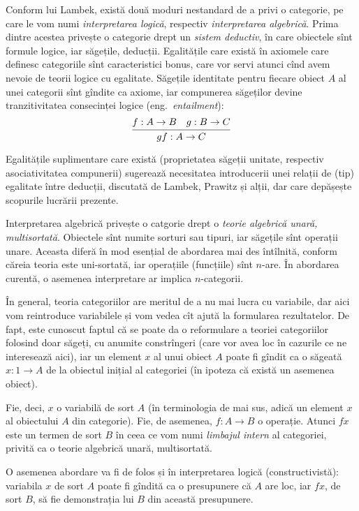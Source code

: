 \documentclass[a4paper]{article}
\begin{document}
Conform lui Lambek, există două moduri nestandard de a privi o categorie,
pe care le vom numi \emph{interpretarea logică}, respectiv \emph{interpretarea %
algebrică}. Prima dintre acestea privește o categorie drept un \emph{sistem %
deductiv}, în care obiectele sînt formule logice, iar săgețile, deducții.
Egalitățile care există în axiomele care definesc categoriile sînt caracteristici
bonus, care vor servi atunci cînd avem nevoie de teorii logice cu egalitate.
Săgețile identitate pentru fiecare obiect $ A $ al unei categorii sînt gîndite
ca axiome, iar compunerea săgeților devine tranzitivitatea consecinței logice
(eng.\ \emph{entailment}):
\[
  \begin{prooftree}
    \hypo{f : A \to B \quad g : B \to C}
    \infer1{gf : A \to C}
  \end{prooftree}
\]

Egalitățile suplimentare care există (proprietatea săgeții unitate, respectiv
asociativitatea compunerii) sugerează necesitatea introducerii unei relații
de (tip) egalitate între deducții, discutată de Lambek, Prawitz și alții,
dar care depășește scopurile lucrării prezente.

Interpretarea algebrică privește o catgorie drept o \emph{teorie algebrică %
unară, multisortată}. Obiectele sînt numite sorturi sau tipuri, iar săgețile
sînt operații unare. Aceasta diferă în mod esențial de abordarea mai des
întîlnită, conform căreia teoria este uni-sortată, iar operațiile (funcțiile)
sînt $n$-are. În abordarea curentă, o asemenea interpretare ar implica
$n$-categorii.

În general, teoria categoriilor are meritul de a nu mai lucra cu variabile,
dar aici vom reintroduce variabilele și vom vedea cît ajută la formularea
rezultatelor. De fapt, este cunoscut faptul că se poate da o reformulare
a teoriei categoriilor folosind doar săgeți, cu anumite constrîngeri (care vor
avea loc în cazurile ce ne interesează aici), iar un element $ x $ al unui
obiect $ A $ poate fi gîndit ca o săgeată $ x : 1 \to A $ de la obiectul
inițial al categoriei (în ipoteza că există un asemenea obiect).

Fie, deci, $ x $ o variabilă de sort $ A $ (în terminologia de mai sus,
adică un element $ x $ al obiectului $ A $ din categorie). Fie, de asemenea,
$ f : A \to B $ o operație. Atunci $ fx $ este un termen de sort $ B $
în ceea ce vom numi \emph{limbajul intern} al categoriei, privită ca o
teorie algebrică unară, multisortată.

O asemenea abordare va fi de folos și în interpretarea logică (constructivistă):
variabila $ x $ de sort $ A $ poate fi gîndită ca o presupunere că $ A $
are loc, iar $ fx $, de sort $ B $, să fie demonstrația lui $ B $ din
această presupunere.
\end{document}
